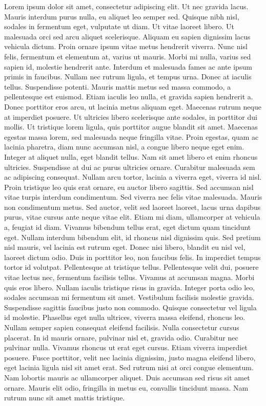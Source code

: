\documentclass{article}
\begin{document}
\begin{pages}
\begin{Leftside}
\beginnumbering
\pstart
Lorem ipsum dolor sit amet, consectetur adipiscing elit. Ut nec gravida lacus. Mauris interdum purus nulla, eu aliquet leo semper sed. Quisque nibh nisl, sodales in fermentum eget, vulputate ut diam. Ut vitae laoreet libero. Ut malesuada orci sed arcu aliquet scelerisque. Aliquam eu sapien dignissim lacus vehicula dictum. Proin ornare ipsum vitae metus hendrerit viverra. Nunc nisl felis, fermentum et elementum at, varius ut mauris. Morbi mi nulla, varius sed sapien id, molestie hendrerit ante. Interdum et malesuada fames ac ante ipsum primis in faucibus. Nullam nec rutrum ligula, et tempus urna. Donec at iaculis tellus. Suspendisse potenti. Mauris mattis metus sed massa commodo, a pellentesque est euismod. Etiam iaculis leo nulla, et gravida sapien hendrerit a.
Donec porttitor eros arcu, ut lacinia metus aliquam eget. Maecenas rutrum neque at imperdiet posuere. Ut ultricies libero scelerisque ante sodales, in porttitor dui mollis. Ut tristique lorem ligula, quis porttitor augue blandit sit amet. Maecenas egestas massa lorem, sed malesuada neque fringilla vitae. Proin egestas, quam ac lacinia pharetra, diam nunc accumsan nisl, a congue libero neque eget enim. Integer at aliquet nulla, eget blandit tellus. Nam sit amet libero et enim rhoncus ultricies. Suspendisse at dui ac purus ultricies ornare. Curabitur malesuada sem ac adipiscing consequat. Nullam arcu tortor, lacinia a viverra eget, viverra id nisl. Proin tristique leo quis erat ornare, eu auctor libero sagittis.
Sed accumsan nisl vitae turpis interdum condimentum. Sed viverra nec felis vitae malesuada. Mauris non condimentum metus. Sed auctor, velit sed laoreet laoreet, lacus urna dapibus purus, vitae cursus ante neque vitae elit. Etiam mi diam, ullamcorper at vehicula a, feugiat id diam. Vivamus bibendum tellus erat, eget dictum quam tincidunt eget. Nullam interdum bibendum elit, id rhoncus nisl dignissim quis.
Sed pretium nisl mauris, vel lacinia est rutrum eget. Donec nisi libero, blandit eu nisl vel, laoreet dictum odio. Duis in porttitor leo, non faucibus felis. In imperdiet tempus tortor id volutpat. Pellentesque at tristique tellus. Pellentesque velit dui, posuere vitae lectus nec, fermentum facilisis tellus. Vivamus at accumsan magna. Morbi quis eros libero. Nullam iaculis tristique risus in gravida. Integer porta odio leo, sodales accumsan mi fermentum sit amet. Vestibulum facilisis molestie gravida. Suspendisse sagittis faucibus justo non commodo. Quisque consectetur vel ligula id molestie.
Phasellus eget nulla ultrices, viverra massa eleifend, rhoncus leo. Nullam semper sapien consequat eleifend facilisis. Nulla consectetur cursus placerat. In id mauris ornare, pulvinar nisl et, gravida odio. Curabitur nec pulvinar nulla. Vivamus rhoncus ut erat eget cursus. Etiam viverra imperdiet posuere. Fusce porttitor, velit nec lacinia dignissim, justo magna eleifend libero, eget lacinia ligula nisl sit amet erat. Sed rutrum nisi at orci congue elementum. Nam lobortis mauris ac ullamcorper aliquet. Duis accumsan sed risus sit amet ornare. Mauris elit odio, fringilla in metus eu, convallis tincidunt massa. Nam rutrum nunc sit amet mattis tristique.


\end{Leftside}
\end{pages}
\end{document}
